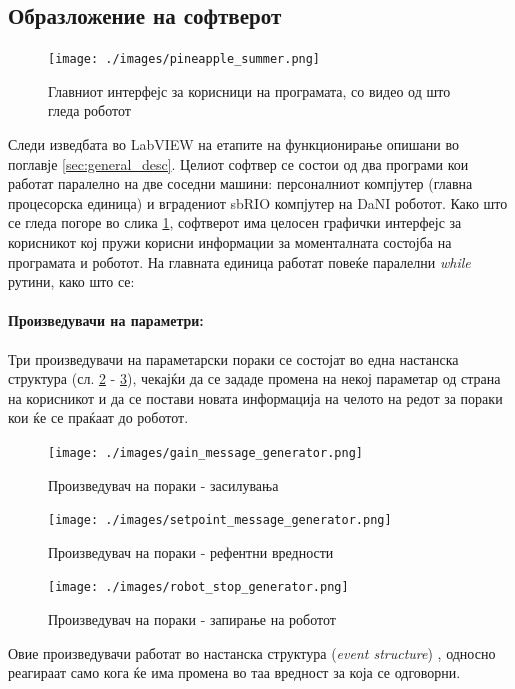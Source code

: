 \documentclass[11pt]{article}
\begin{document}
  \subsection{Образложение на софтверот}
    \begin{figure}[H]
      \centering
      \texttt{[image: ./images/pineapple\_summer.png]}
      \label{fig:pineapple}
      \caption{Главниот интерфејс за корисници на програмата, со видео од што гледа роботот}
      \end{figure}

    Следи изведбата во LabVIEW на етапите на функционирање опишани во поглавје \ref{sec:general_desc}. Целиот софтвер се состои од два програми кои работат паралелно на две соседни машини: персоналниот компјутер (главна процесорска единица) и вградениот sbRIO компјутер на DaNI роботот. Како што се гледа погоре во слика \ref{fig:pineapple}, софтверот има целосен графички интерфејс за корисникот кој пружи корисни информации за моменталната состојба на програмата и роботот. На главната единица работат повеќе паралелни \textit{while} рутини, како што се:

    \paragraph{Произведувачи на параметри:\\}
      Три произведувачи на параметарски пораки се состојат во една настанска структура (сл. \ref{fig:gains} - \ref{fig:stop}), чекајќи да се зададе промена на некој параметар од страна на корисникот и да се постави новата информација на челото на редот за пораки кои ќе се праќаат до роботот.
      \begin{figure}[H]
          \centering
          \texttt{[image: ./images/gain\_message\_generator.png]}
          \caption{Произведувач на пораки - засилувања}
          \label{fig:gains}
          \end{figure}
      \begin{figure}[H]
          \centering
          \texttt{[image: ./images/setpoint\_message\_generator.png]}
          \caption{Произведувач на пораки - рефентни вредности}
          \end{figure}
      \begin{figure}[H]
          \centering
          \texttt{[image: ./images/robot\_stop\_generator.png]}
          \caption{Произведувач на пораки - запирање на роботот}
          \label{fig:stop}
          \end{figure}
      Овие произведувачи работат во настанска структура (\textit{event structure}) \cite{lvforeveryone}, односно реагираат само кога ќе има промена во таа вредност за која се одговорни.
\end{document}
